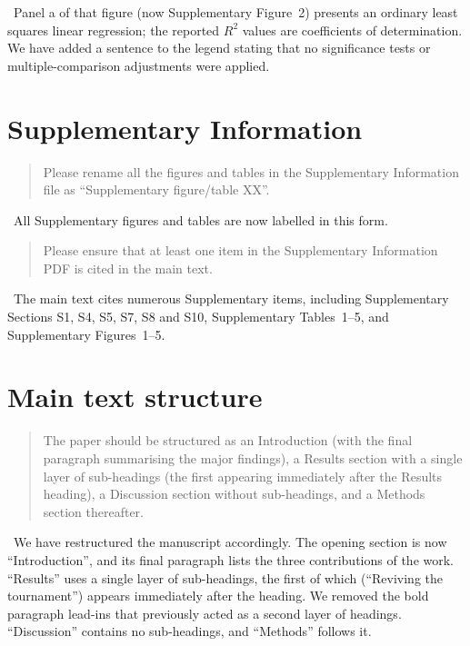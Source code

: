 \documentclass[11pt]{article}
\newcommand{\reply}{\vspace{0.25em}{\color{ForestGreen}\textbf{Reply:}}\ }
\newenvironment{editorcomment}
{\vspace{0.5em}\begin{quote}\color{NavyBlue}}
{\end{quote}}
\begin{document}
\reply Panel a of that figure (now Supplementary Figure~2) presents an ordinary
least squares linear regression; the reported \(R^2\) values are coefficients of
determination. We have added a sentence to the legend stating that no
significance tests or multiple-comparison adjustments were applied.

\section*{Supplementary Information}

\begin{editorcomment}
Please rename all the figures and tables in the Supplementary Information file as
``Supplementary figure/table XX''.
\end{editorcomment}

\reply All Supplementary figures and tables are now labelled in this form.

\begin{editorcomment}
Please ensure that at least one item in the Supplementary Information PDF is
cited in the main text.
\end{editorcomment}

\reply The main text cites numerous Supplementary items, including Supplementary
Sections S1, S4, S5, S7, S8 and S10, Supplementary Tables~1--5, and Supplementary
Figures~1--5.

\section*{Main text structure}

\begin{editorcomment}
The paper should be structured as an Introduction (with the final paragraph
summarising the major findings), a Results section with a single layer of
sub-headings (the first appearing immediately after the Results heading), a
Discussion section without sub-headings, and a Methods section thereafter.
\end{editorcomment}

\reply We have restructured the manuscript accordingly. The opening section is
now ``Introduction'', and its final paragraph lists the three contributions of
the work. ``Results'' uses a single layer of sub-headings, the first of which
(``Reviving the tournament'') appears immediately after the heading. We removed
the bold paragraph lead-ins that previously acted as a second layer of headings.
``Discussion'' contains no sub-headings, and ``Methods'' follows it.
\end{document}
